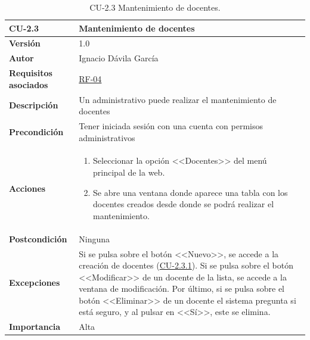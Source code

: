 \begin{table}[p]
\label{table:CU-2.3}
	\centering
	\begin{tabularx}{\linewidth}{ p{} p{} }
		\toprule
		\textbf{CU-2.3}    & \textbf{Mantenimiento de docentes}\\
		\toprule
		\textbf{Versión}              & 1.0    \\
		\textbf{Autor}                & Ignacio Dávila García \\
		\textbf{Requisitos asociados} & \hyperref[itm:RF4]{RF-04} \\
		\textbf{Descripción}          & Un administrativo puede realizar el mantenimiento de docentes \\
		\textbf{Precondición}         & Tener iniciada sesión con una cuenta con permisos administrativos \\
		\textbf{Acciones}             &
		\begin{enumerate}
			\def\labelenumi{\arabic{enumi}.}
			\tightlist
			\item Seleccionar la opción <<Docentes>> del menú principal de la web.
			\item Se abre una ventana donde aparece una tabla con los docentes creados desde donde se podrá realizar el mantenimiento.
		\end{enumerate}\\
		\textbf{Postcondición}        & Ninguna \\
		\textbf{Excepciones}          & Si se pulsa sobre el botón <<Nuevo>>, se accede a la creación de docentes (\hyperref[table:CU-2.3.1]{CU-2.3.1}). Si se pulsa sobre el botón <<Modificar>> de un docente de la lista, se accede a la ventana de modificación. Por último, si se pulsa sobre el botón <<Eliminar>> de un docente el sistema pregunta si está seguro, y al pulsar en <<Sí>>, este se elimina. \\
		\textbf{Importancia}          & Alta \\
		\bottomrule
	\end{tabularx}
	\caption{CU-2.3 Mantenimiento de docentes.}
\end{table}
\FloatBarrier


